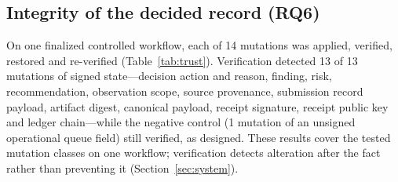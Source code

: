 

\subsection{Integrity of the decided record (RQ6)}
On one finalized controlled workflow, each of 14 mutations was applied,
verified, restored and re-verified (Table~\ref{tab:trust}). Verification detected
13 of 13 mutations of signed state---decision action and
reason, finding, risk, recommendation, observation scope, source provenance,
submission record payload, artifact digest, canonical payload, receipt signature,
receipt public key and ledger chain---while the negative control (1
mutation of an unsigned operational queue field) still verified, as designed. These
results cover the tested mutation classes on one workflow; verification detects
alteration after the fact rather than preventing it (Section~\ref{sec:system}).


